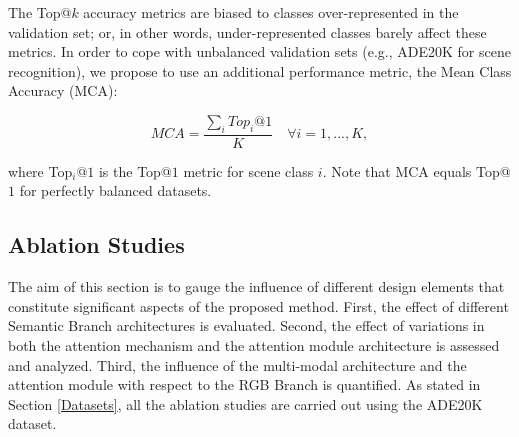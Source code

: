 \documentclass[review, 3p, sort&compress]{elsarticle}
\begin{document}
The Top@\(k\) accuracy metrics are biased to classes over-represented in the validation set; or, in other words, under-represented classes barely affect these metrics. In order to cope with unbalanced validation sets (e.g., ADE20K for scene recognition), we propose to use an additional performance metric, the Mean Class Accuracy (MCA):

\begin{equation}
    MCA = \frac{\sum_{i}Top_{i}@1}{K} \quad \forall i=1,...,K,
\end{equation}

where Top\(_{i}\)@\(1\) is the Top@\(1\) metric for scene class \(i\). Note that MCA equals Top@\(1\) for perfectly balanced datasets. 

\begin{table}[!t]
\end{table}

\subsection{Ablation Studies}\label{subsec:Ablation Studies}
The aim of this section is to gauge the influence of different design elements that constitute significant aspects of the proposed method. First, the effect of different Semantic Branch architectures is evaluated. Second, the effect of variations in both the attention mechanism and the attention module architecture is assessed and analyzed. Third, the influence of the multi-modal architecture and the attention module with respect to the RGB Branch is quantified. As stated in Section \ref{Datasets}, all the ablation studies are carried out using the ADE20K dataset.
\end{document}
